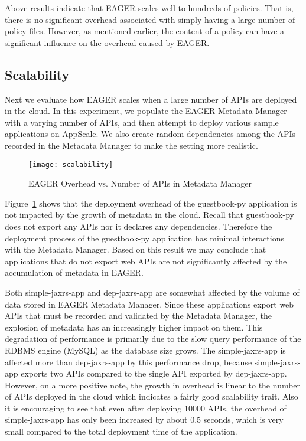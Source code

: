 Above results indicate that EAGER scales well to hundreds of policies. That is, there is no significant overhead associated with simply having
a large number of policy files. However, as mentioned earlier, the content of a policy can have a significant influence on the overhead
 caused by EAGER.
 
\subsection{Scalability}
Next we evaluate how EAGER scales when a large number of APIs are deployed in the cloud. In this experiment, we populate the EAGER
Metadata Manager with a varying number of APIs, and then attempt to deploy various sample applications on AppScale. We also create
random dependencies among the APIs recorded in the Metadata Manager to make the setting more realistic.

\begin{figure}
\centering
\texttt{[image: scalability]}
\caption{EAGER Overhead vs. Number of APIs in Metadata Manager}
\label{fig:scalability}
\end{figure}

Figure~\ref{fig:scalability} shows that the deployment overhead of the guestbook-py application is not impacted by the growth of metadata
in the cloud. Recall that guestbook-py does not export any APIs nor it declares any dependencies. Therefore the deployment process of
the guestbook-py application has minimal interactions with the Metadata Manager. Based on this result we may conclude that applications that
do not export web APIs are not significantly affected by the accumulation of metadata in EAGER.

Both simple-jaxrs-app and dep-jaxrs-app are
somewhat affected by the volume of data stored in EAGER Metadata Manager. Since these applications export web APIs that must be 
recorded and validated by the Metadata Manager, the explosion of metadata has an increasingly higher impact on them. This degradation 
of performance is primarily due to the slow query performance of the RDBMS engine (MySQL) as the database size grows. The simple-jaxrs-app
is affected more than dep-jaxrs-app by this performance drop, because simple-jaxrs-app exports two APIs compared to the single API exported 
by dep-jaxrs-app. However, on a more positive note, the growth
in overhead is linear to the number of APIs deployed in the cloud which indicates a fairly good scalability trait. Also it is encouraging to see that
even after deploying 10000 APIs, the overhead of simple-jaxrs-app has only been increased by about 0.5 seconds, which is very small compared
to the total deployment time of the application.

